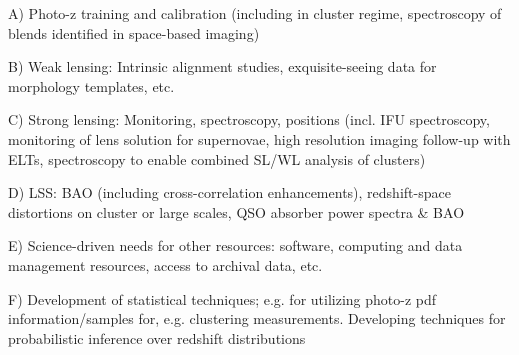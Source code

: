 \documentclass[12pt]{report}
\begin{document}
\pagestyle{fancy}
\fancyfoot{}%
\fancyfoot[R]{\thepage}  %

\fancyhead[R]{}
\renewcommand{\footrulewidth}{1pt}

	A) Photo-z training and calibration (including in cluster regime, spectroscopy of blends identified in space-based imaging)

	B) Weak lensing: Intrinsic alignment studies, exquisite-seeing data for morphology templates, etc.


	C) Strong lensing: Monitoring, spectroscopy, positions (incl. IFU spectroscopy, monitoring of lens solution for supernovae, high resolution imaging follow-up with ELTs, spectroscopy to enable combined SL/WL analysis of clusters)

	D) LSS: BAO (including cross-correlation enhancements), redshift-space distortions on cluster or large scales, QSO absorber power spectra \& BAO

	E) Science-driven needs for other resources: software, computing and data management resources, access to archival data, etc.

F) Development of statistical techniques; e.g. for utilizing photo-z pdf information/samples for, e.g. clustering measurements.  Developing techniques for probabilistic inference over redshift distributions



 

 
\end{document}
